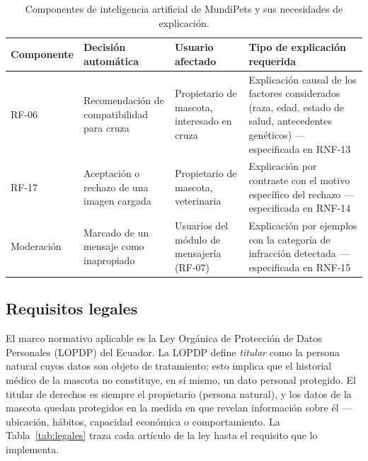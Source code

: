 \documentclass[journal,onecolumn]{IEEEtran}
\begin{document}
	\begin{table}[H]
		\centering
		\caption{Componentes de inteligencia artificial de MundiPets y sus necesidades de explicación.}
		\label{tab:componentes-ia}
		\small
		\begin{tabularx}{\textwidth}{@{}p{2.0cm} p{3.0cm} p{2.6cm} X@{}}
			\toprule
			\textbf{Componente} & \textbf{Decisión automática} & \textbf{Usuario afectado} & \textbf{Tipo de explicación requerida} \\
			\midrule
			RF-06 & Recomendación de compatibilidad para cruza & Propietario de mascota, interesado en cruza & Explicación causal de los factores considerados (raza, edad, estado de salud, antecedentes genéticos) --- especificada en RNF-13 \\
			\addlinespace
			RF-17 & Aceptación o rechazo de una imagen cargada & Propietario de mascota, veterinaria & Explicación por contraste con el motivo específico del rechazo --- especificada en RNF-14 \\
			\addlinespace
			Moderación & Marcado de un mensaje como inapropiado & Usuarios del módulo de mensajería (RF-07) & Explicación por ejemplos con la categoría de infracción detectada --- especificada en RNF-15 \\
			\bottomrule
		\end{tabularx}
	\end{table}
	
	\subsection{Requisitos legales}
	\label{sec:legales}
	
	El marco normativo aplicable es la Ley Orgánica de Protección de Datos Personales
	(LOPDP) del Ecuador. La LOPDP define \emph{titular} como la persona natural cuyos
	datos son objeto de tratamiento; esto implica que el historial médico de la mascota
	no constituye, en sí mismo, un dato personal protegido. El titular de derechos es
	siempre el propietario (persona natural), y los datos de la mascota quedan
	protegidos en la medida en que revelan información sobre él --- ubicación, hábitos,
	capacidad económica o comportamiento. La Tabla~\ref{tab:legales} traza cada
	artículo de la ley hasta el requisito que lo implementa.
	
\end{document}
